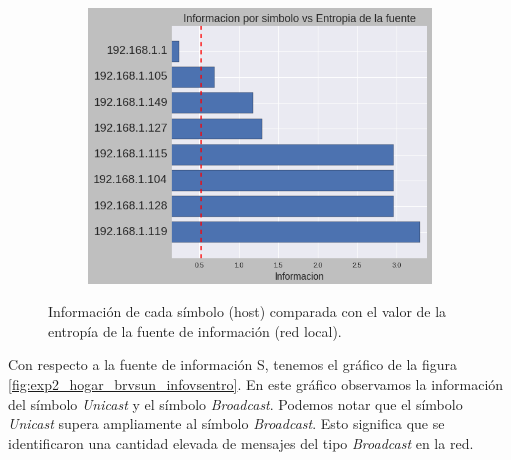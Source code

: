 \begin{figure}[h]
  \begin{subfigure}{.5\textwidth}
    \includegraphics[width=\textwidth]{imagenes/hogarenia/hosts_informaciones_vs_entropia.png}
  \end{subfigure}
  \label{fig:exp2_hogar_hosts_infovsentro}
  \caption{Información de cada símbolo (host) comparada con el valor de la entropía de la fuente de información (red local).}
\end{figure}

\par Con respecto a la fuente de información S, tenemos el gráfico de la figura \ref{fig:exp2_hogar_brvsun_infovsentro}. En este gráfico observamos la información del símbolo \textit{Unicast} y el símbolo \textit{Broadcast}. Podemos notar que el símbolo \textit{Unicast} supera ampliamente al símbolo \textit{Broadcast}. Esto significa que se identificaron una cantidad elevada de mensajes del tipo \textit{Broadcast} en la red.

